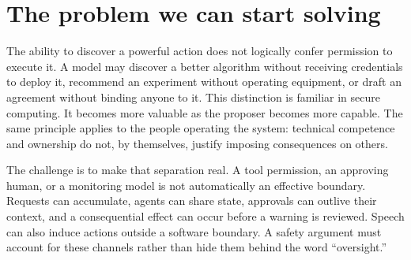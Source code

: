 \section{The problem we can start solving}

The ability to discover a powerful action does not logically confer permission to execute it. A model may discover a better algorithm without receiving credentials to deploy it, recommend an experiment without operating equipment, or draft an agreement without binding anyone to it. This distinction is familiar in secure computing. It becomes more valuable as the proposer becomes more capable. The same principle applies to the people operating the system: technical competence and ownership do not, by themselves, justify imposing consequences on others.

The challenge is to make that separation real. A tool permission, an approving human, or a monitoring model is not automatically an effective boundary. Requests can accumulate, agents can share state, approvals can outlive their context, and a consequential effect can occur before a warning is reviewed. Speech can also induce actions outside a software boundary. A safety argument must account for these channels rather than hide them behind the word ``oversight.''

